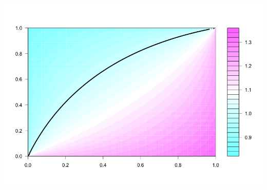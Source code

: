 \documentclass[11pt]{article}
\theoremstyle{definition}
\theoremstyle{remark}
\theoremstyle{definition}
\begin{document}
\begin{enumerate}
\begin{enumerate}
\includegraphics[scale=.4]{heat}



\end{enumerate}
\end{enumerate}
\end{document}
